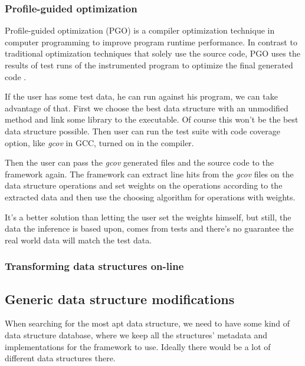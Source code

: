 \documentclass[11pt]{article}
\begin{document}
		\subsubsection{Profile-guided optimization}

			Profile-guided optimization (PGO) is a compiler optimization technique in computer programming
			to improve program runtime performance.  In contrast to traditional optimization techniques that
			solely use the source code, PGO uses the results of test runs of the instrumented program to
			optimize the final generated code .

			If the user has some test data, he can run against his program, we can take advantage of that.
			First we choose the best data structure with an unmodified method and link some library to the
			executable. Of course this won't be the best data structure possible. Then user can run the test
			suite with code coverage option, like \emph{gcov} in GCC, turned on in the compiler.



			Then the user can pass the \emph{gcov} generated files and the source code to the framework
			again. The framework can extract line hits from the \emph{gcov} files on the data structure
			operations and set weights on the operations according to the extracted data and then use the
			choosing algorithm for operations with weights.

			It's a better solution than letting the user set the weights himself, but still, the data the
			inference is based upon, comes from tests and there's no guarantee the real world data will
			match the test data.

		\subsubsection{Transforming data structures on-line} \label{sec:transforming-on-line}

	\subsection{Generic data structure modifications}

		When searching for the most apt data structure, we need to have some kind of data structure database,
		where we keep all the structures' metadata and implementations for the framework to use. Ideally there
		would be a lot of different data structures there.
\end{document}
